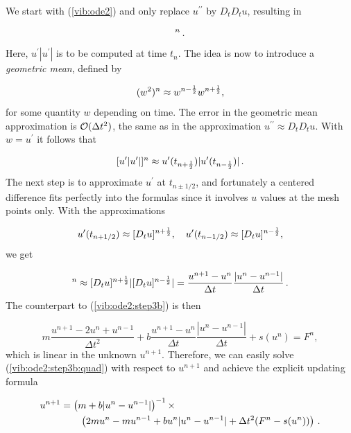 \documentclass[%
oneside,                 %
final,                   %
10pt]{article}
\begin{document}

We start with (\ref{vib:ode2}) and only replace
$u^{\prime\prime}$ by $D_tD_tu$, resulting in

\begin{equation}
[mD_tD_t u + bu^{\prime}|u^{\prime}| + s(u) = F]^n\tp
\label{vib:ode2:quad:idea1}
\end{equation}
Here, $u^{\prime}|u^{\prime}|$ is to be computed at time $t_n$. The idea
is now to introduce
a \emph{geometric mean}, defined by

\[ (w^2)^n \approx w^{n-\half}w^{n+\half},\]
for some quantity $w$ depending on time. The error in the geometric mean
approximation is $\Oof{\Delta t^2}$, the same as in the
approximation $u^{\prime\prime}\approx D_tD_tu$. With $w=u^{\prime}$ it follows
that

\[ [u^{\prime}|u^{\prime}|]^n \approx u^{\prime}(t_{n+\half})|u^{\prime}(t_{n-\half})|\tp\]
The next step is to approximate
$u^{\prime}$ at $t_{n\pm 1/2}$, and fortunately a centered difference
fits perfectly into the formulas since it involves $u$ values at
the mesh points only. With the approximations


\begin{equation}
u^{\prime}(t_{n+1/2})\approx [D_t u]^{n+\half},\quad u^{\prime}(t_{n-1/2})\approx [D_t u]^{n-\half},
\label{vib:ode2:quad:idea2}
\end{equation}
we get

\begin{equation}
[u^{\prime}|u^{\prime}|]^n
\approx [D_tu]^{n+\half}|[D_tu]^{n-\half}| = \frac{u^{n+1}-u^n}{\Delta t}
\frac{|u^n-u^{n-1}|}{\Delta t}
\tp
\end{equation}
The counterpart to (\ref{vib:ode2:step3b}) is then

\begin{equation}
m\frac{u^{n+1}-2u^n + u^{n-1}}{\Delta t^2}
+ b\frac{u^{n+1}-u^n}{\Delta t}\frac{|u^n-u^{n-1}|}{\Delta t}
+ s(u^n) = F^n,
\label{vib:ode2:step3b:quad}
\end{equation}
which is linear in the unknown $u^{n+1}$. Therefore, we can easily solve
(\ref{vib:ode2:step3b:quad})
with respect to $u^{n+1}$ and achieve the explicit updating formula

\begin{align}
u^{n+1} &=  \left( m + b|u^n-u^{n-1}|\right)^{-1}\times \nonumber\\ 
& \qquad \left(2m u^n - mu^{n-1} + bu^n|u^n-u^{n-1}| + \Delta t^2 (F^n - s(u^n))
\right)
\tp
\label{vib:ode2:step4:quad}
\end{align}
\end{document}

